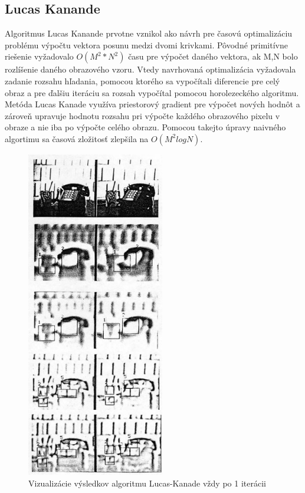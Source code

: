 \subsection{Lucas Kanande}
Algoritmus Lucas Kanande prvotne vznikol ako návrh pre časovú optimalizáciu problému výpočtu vektora posunu medzi dvomi krivkami.
Pôvodné primitívne riešenie vyžadovalo \begin{math} O(M^2 * N^2) \end{math} času pre výpočet daného vektora, ak M,N bolo rozlíšenie daného obrazového vzoru.
Vtedy navrhovaná optimalizácia vyžadovala zadanie rozsahu hľadania, pomocou ktorého sa vypočítali diferencie pre celý obraz a pre ďalšiu iteráciu sa rozsah vypočítal pomocou horolezeckého algoritmu.
Metóda Lucas Kanade využíva priestorový gradient pre výpočet nových hodnôt a zároveň upravuje hodnotu rozsahu pri výpočte každého obrazového pixelu v obraze a nie iba po výpočte celého obrazu.
Pomocou takejto úpravy naivného algortimu sa časová zložitosť zlepšila na \begin{math} O(M^2 log N) \end{math}\cite{lucas-kanade}.

\begin{figure}[H]
  \centering
  \includegraphics[width=6cm]{pics/lukas-kanade.jpg}
  \caption{Vizualizácie výsledkov algoritmu Lucas-Kanade vždy po 1 iterácii\cite{lucas-kanade}}
\end{figure}
\vspace{10mm}

